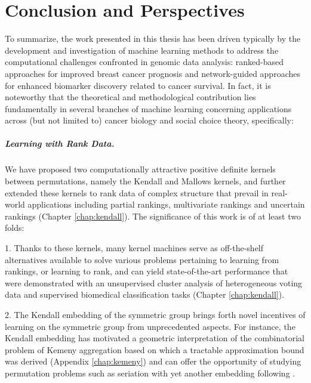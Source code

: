 \chapter{Conclusion and Perspectives}
\label{chap:conclusion}

To summarize, the work presented in this thesis has been driven typically by the development and investigation of machine learning methods to address the computational challenges confronted in genomic data analysis: ranked-based approaches for improved breast cancer prognosis and network-guided approaches for enhanced biomarker discovery related to cancer survival. In fact, it is noteworthy that the theoretical and methodological contribution lies fundamentally in several branches of machine learning concerning applications across (but not limited to) cancer biology and social choice theory, specifically:

\paragraph{Learning with Rank Data.}

We have proposed two computationally attractive positive definite kernels between permutations, namely the Kendall and Mallows kernels, and further extended these kernels to rank data of complex structure that prevail in real-world applications including partial rankings, multivariate rankings and uncertain rankings (Chapter \ref{chap:kendall}). The significance of this work is of at least two folds: 
\begin{bulletList}
\item[1.] Thanks to these kernels, many kernel machines serve as off-the-shelf alternatives available to solve various problems pertaining to learning from rankings, or learning to rank, and can yield state-of-the-art performance that were demonstrated with an unsupervised cluster analysis of heterogeneous voting data and supervised biomedical classification tasks (Chapter \ref{chap:kendall}).
\item[2.] The Kendall embedding of the symmetric group brings forth novel incentives of learning on the symmetric group from unprecedented aspects. For instance, the Kendall embedding has motivated a geometric interpretation of the combinatorial problem of Kemeny aggregation based on which a tractable approximation bound was derived (Appendix \ref{chap:kemeny}) and can offer the opportunity of studying permutation problems such as seriation with yet another embedding following \cite{Fogel2013Convex, Lim2014Beyond}.
\end{bulletList}

